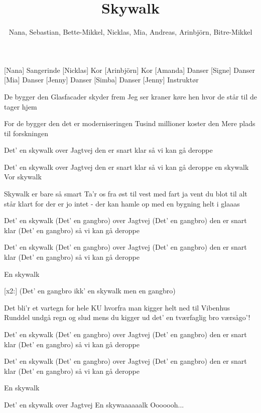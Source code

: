 \documentclass[a4paper,11pt]{article}
\title{Skywalk}
\author{Nana, Sebastian, Bette-Mikkel, Nicklas, Mia, Andreas, Arinbjörn, Bitre-Mikkel}
\begin{document}
\maketitle

\begin{roles}
[Nana] Sangerinde
[Nicklas] Kor
[Arinbjörn] Kor
[Amanda] Danser
[Signe] Danser
[Mia] Danser
[Jenny] Danser
[Simba] Danser
[Jenny] Instruktør
\end{roles}

\begin{song}

%
De bygger den
Glasfacader skyder frem
Jeg ser kraner køre hen
hvor de står til de tager hjem

For de bygger den
det er moderniseringen
Tusind millioner koster den
Mere plads til forskningen

Det' en skywalk
over Jagtvej
den er snart klar
så vi kan gå deroppe

Det' en skywalk
over Jagtvej
den er snart klar
så vi kan gå deroppe
en skywalk
Vor skywalk

Skywalk er bare så smart
Ta'r os fra øst til vest med fart
ja vent du blot til alt står klart
for der er jo intet - der kan hamle op
med en bygning helt i glaaas

Det' en skywalk (Det' en gangbro)
over Jagtvej (Det' en gangbro)
den er snart klar (Det' en gangbro)
så vi kan gå deroppe

Det' en skywalk (Det' en gangbro)
over Jagtvej (Det' en gangbro)
den er snart klar (Det' en gangbro)
så vi kan gå deroppe

En skywalk

[x2:]
(Det' en gangbro
ikk' en skywalk
men en gangbro)

Det bli'r et vartegn
for hele KU
hvorfra man kigger helt ned
til Vibenhus Runddel
undgå regn og slud
mens du kigger ud
det' en tværfaglig bro
værsågo'!

Det' en skywalk (Det' en gangbro)
over Jagtvej (Det' en gangbro)
den er snart klar (Det' en gangbro)
så vi kan gå deroppe

Det' en skywalk (Det' en gangbro)
over Jagtvej (Det' en gangbro)
den er snart klar (Det' en gangbro)
så vi kan gå deroppe

En skywalk

Det' en skywalk
over Jagtvej
En skywaaaaaalk
Ooooooh...

\end{song}
\end{document}
